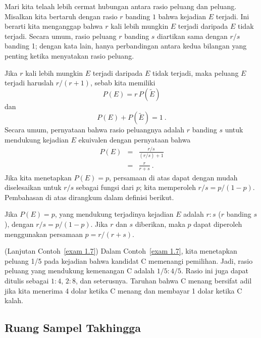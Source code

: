 Mari kita telaah lebih cermat hubungan antara rasio peluang dan peluang.
Misalkan kita bertaruh dengan rasio $r$ banding $1$ bahwa kejadian $E$ terjadi. 
Ini berarti kita menganggap bahwa $r$ kali lebih mungkin $E$ terjadi
daripada $E$
tidak terjadi.  Secara umum, rasio peluang $r$ banding $s$ diartikan sama
dengan
$r/s$ banding 1; dengan kata lain, hanya perbandingan antara kedua bilangan yang
penting ketika menyatakan rasio peluang.  
\par
Jika $r$ kali lebih mungkin $E$ terjadi daripada $E$
tidak terjadi, maka peluang $E$ terjadi haruslah $r/(r+1)$, sebab kita
memiliki
$$P(E) = r\,P(\tilde E)$$
dan
$$P(E) + P(\tilde E) = 1\ .$$
Secara umum, pernyataan bahwa rasio peluangnya adalah $r$ banding $s$ untuk mendukung kejadian
$E$
ekuivalen dengan pernyataan bahwa 
\begin{eqnarray*}
P(E) & = & \frac{r/s}{(r/s) + 1}\\
& = & \frac {r}{r+s}\ .
\end{eqnarray*}
Jika kita menetapkan $P(E) = p$, persamaan di atas dapat dengan mudah diselesaikan untuk $r/s$
sebagai fungsi dari
$p$; kita memperoleh $r/s = p/(1-p)$.  Pembahasan di atas dirangkum dalam
definisi berikut. 

\begin{definition}\label{def 1.4} 
Jika $P(E) = p$,  yang mendukung terjadinya kejadian $E$ adalah $r :
s$ ($r$ banding $s$), dengan $r/s = p/(1-p)$.  Jika $r$ dan $s$ diberikan, maka $p$ 
dapat diperoleh menggunakan persamaan $p = r/(r+s)$.
\end{definition}
\begin{example}(Lanjutan Contoh~\ref{exam 1.7})\label{exam 1.9}
Dalam Contoh~\ref{exam 1.7}, kita menetapkan peluang 1/5 pada kejadian bahwa
kandidat C memenangi pemilihan.  Jadi, rasio peluang yang mendukung kemenangan C adalah $1/5 :
4/5$.  Rasio ini juga dapat ditulis sebagai $1 : 4$, $2
: 8$, dan seterusnya.  Taruhan bahwa C menang bersifat adil jika kita menerima 4 dolar
ketika C menang dan membayar 1 dolar ketika C kalah.
\end{example}

\subsection*{Ruang Sampel Takhingga}

